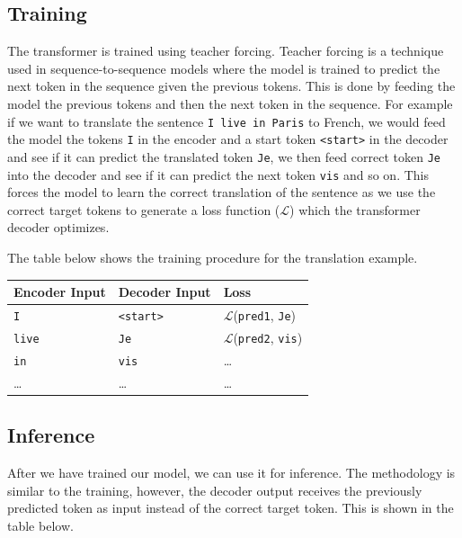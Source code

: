 \documentclass[../../main.tex]{subfiles}
\begin{document}
\subsection{Training}

The transformer is trained using teacher forcing. Teacher forcing is a technique used in sequence-to-sequence models where the model is trained to predict the next token in the sequence given the previous tokens. This is done by feeding the model the previous tokens and then the next token in the sequence. For example if we want to translate the sentence \texttt{I live in Paris} to French, we would feed the model the tokens \texttt{I} in the encoder and a start token \texttt{<start>} in the decoder and see if it can predict the translated token \texttt{Je}, we then feed correct token \texttt{Je} into the decoder and see if it can predict the next token \texttt{vis} and so on. This forces the model to learn the correct translation of the sentence as we use the correct target tokens to generate a loss function ($\mathcal{L}$) which the transformer decoder optimizes.

The table below shows the training procedure for the translation example. 

\begin{table}[H]
	\centering
	\begin{tabular}{lll}
	\toprule
	{Encoder Input} & {Decoder Input} & {Loss} \\
	\midrule
	\texttt{I}                     & \texttt{<start>} & $\mathcal{L}$(\texttt{pred1}, \texttt{Je}) \\
	\texttt{live}                  & \texttt{Je}                     & $\mathcal{L}$(\texttt{pred2}, \texttt{vis}) \\
	\texttt{in}                    & \texttt{vis}                    & \ldots \\
	\ldots                & \ldots                 & \ldots \\
	\bottomrule
	\end{tabular}
	\end{table}

\subsection{Inference}

After we have trained our model, we can use it for inference. The methodology is similar to the training, however, the decoder output receives the previously predicted token as input instead of the correct target token. This is shown in the table below.
\end{document}
